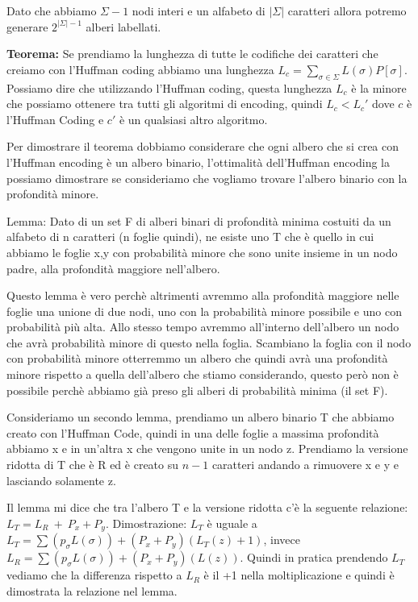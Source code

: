 \documentclass[14pt]{extreport}
\begin{document}
Dato che abbiamo $\Sigma-1$ nodi interi e un alfabeto di $|\Sigma|$ caratteri allora potremo generare $2^{|\Sigma|-1}$ alberi labellati.

\textbf{Teorema:} Se prendiamo la lunghezza di tutte le codifiche dei caratteri che creiamo con l'Huffman coding abbiamo una lunghezza $L_c=\sum_{\sigma \in \Sigma} L(\sigma)P[\sigma]$.
Possiamo dire che utilizzando l'Huffman coding, questa lunghezza $L_c$ è la minore che possiamo ottenere tra tutti gli algoritmi di encoding, quindi $L_c<L_c'$ dove $c$ è l'Huffman Coding e $c'$ è un qualsiasi altro algoritmo.

Per dimostrare il teorema dobbiamo considerare che ogni albero che si crea con l'Huffman encoding è un albero binario, l'ottimalità dell'Huffman encoding la possiamo dimostrare se consideriamo che vogliamo trovare l'albero binario con la profondità minore.

Lemma: Dato di un set F di alberi binari di profondità minima costuiti da un alfabeto di n caratteri (n foglie quindi), ne esiste uno T che è quello in cui abbiamo le foglie x,y con probabilità minore che sono unite insieme in un nodo padre, alla profondità maggiore nell'albero.

Questo lemma è vero perchè altrimenti avremmo alla profondità maggiore nelle foglie una unione di due nodi, uno con la probabilità minore possibile e uno con probabilità più alta. Allo stesso tempo avremmo all'interno dell'albero un nodo che avrà probabilità minore di questo nella foglia. Scambiano la foglia con il nodo con probabilità minore otterremmo un albero che quindi avrà una profondità minore rispetto a quella dell'albero che stiamo considerando, questo però non è possibile perchè abbiamo già preso gli alberi di probabilità minima (il set F).

Consideriamo un secondo lemma, prendiamo un albero binario T che abbiamo creato con l'Huffman Code, quindi in una delle foglie a massima profondità abbiamo x e in un'altra x che vengono unite in un nodo z. Prendiamo la versione ridotta di T che è R ed è creato su $n-1$ caratteri andando a rimuovere x e y e lasciando solamente z.

Il lemma mi dice che tra l'albero T e la versione ridotta c'è la seguente relazione: $L_T = L_R\ + \ P_x + P_y$.
Dimostrazione: $L_T$ è uguale a $L_T=\sum(p_\sigma L(\sigma))+(P_x+P_y)(L_T(z)+1)$, invece $L_R=\sum(p_\sigma L(\sigma))+(P_x+P_y)(L(z))$. Quindi in pratica prendendo $L_T$ vediamo che la differenza rispetto a $L_R$ è il +1 nella moltiplicazione e quindi è dimostrata la relazione nel lemma.
\end{document}
